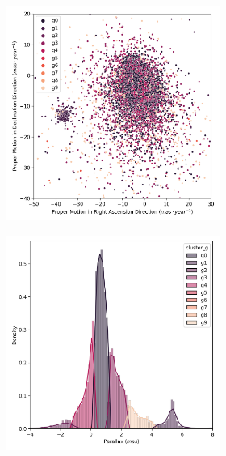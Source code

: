 \documentclass[11pt,a4paper,english,twocolumn]{article}
\begin{document}
\begin{figure}[htbp]
\begin{subfigure}{\columnwidth}
\begin{subfigure}[t]{0.30\textwidth}
    \end{subfigure}
  \end{subfigure}
  \centering
  \begin{subfigure}{\columnwidth}
    \centering
    \begin{subfigure}[t]{0.30\textwidth}
      \centering
      \includegraphics[width=\textwidth]{../figures/ngc_2632/kmeans_pm_ngc_2632.png}
    \end{subfigure}
    \hfill
    \begin{subfigure}[t]{0.30\textwidth}
      \centering
      \includegraphics[width=\textwidth]{../figures/ngc_2632/kmeans_parallax_ngc_2632.png}

\end{subfigure}
\end{subfigure}
\end{figure}
\end{document}
